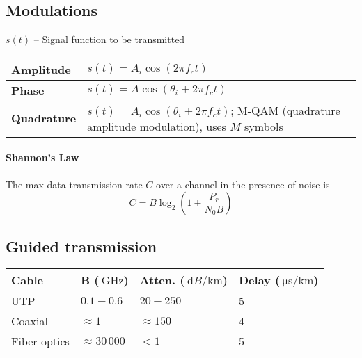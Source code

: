 \documentclass{form}
\begin{document}
\begin{minipage}[c]{0.33\textwidth}
    \subsection*{Modulations}
    $s(t)$ -- Signal function to be transmitted

    \begin{tabular}{@{}l | p{13.0em}@{}}
        \textbf{Amplitude}  & $s(t) = A_i \cos{(2\pi f_c t)}$ \\ \hline
        \textbf{Phase}      & $s(t) = A \cos{(\theta_i + 2\pi f_c t)}$ \\ \hline
        \textbf{Quadrature} & $s(t) = A_i \cos{(\theta_i + 2\pi f_c t)}$; M-QAM (quadrature amplitude modulation), uses $M$ symbols
    \end{tabular}

    \paragraph{Shannon's Law}
    The max data transmission rate $C$ over a channel in the presence of noise is
    \begin{equation*}
        C = B \log_2{\left(1+\frac{P_r}{N_0 B}\right)}
    \end{equation*}

    \subsection*{Guided transmission}
    \begin{tabular}{@{}l | p{3.8em} | p{3.5em} | p{3.7em}@{}}
        \textbf{Cable} & \textbf{B ($\SI{}{\giga\hertz}$)} & \textbf{Atten. ($\SI{}{\deci B / \kilo\meter}$)} & \textbf{Delay ($\SI{}{\micro\second / \kilo\meter}$)} \\ \hline
        UTP            & $0.1-0.6        $ & $20-250$       & 5 \\
        Coaxial        & $\approx 1      $ & $\approx 150$  & 4 \\
        Fiber optics   & $\approx 30\,000$ & $< 1$          & 5 \\
    \end{tabular}
\end{minipage}
\end{document}
